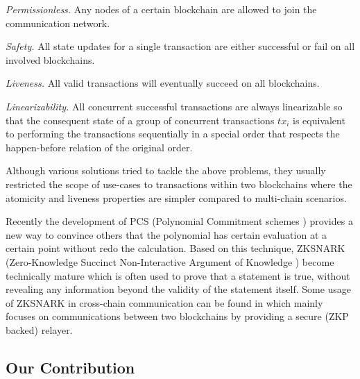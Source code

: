 \smallskip\noindent\emph{Permissionless.} Any nodes of a certain blockchain are allowed to join the communication network.

\smallskip\noindent\emph{Safety.} All state updates for a single transaction are either successful or fail on all involved blockchains.

\smallskip\noindent\emph{Liveness.} All valid transactions will eventually succeed on all blockchains.

\smallskip\noindent\emph{Linearizability.} All concurrent successful transactions are always linearizable so that the consequent state of a group of concurrent transactions $tx_i$ is equivalent to performing the transactions sequentially in a special order that respects the happen-before relation of the original order.

Although various solutions tried to tackle the above problems, they usually restricted the scope of use-cases to transactions within two blockchains where the atomicity and liveness properties are simpler compared to multi-chain scenarios.

Recently the development of PCS (Polynomial Commitment schemes \cite{boneh2020halo-pcs,boneh2020efficient-pcs,kate2010polynomial-pcs}) provides a new way to convince others that the polynomial has certain evaluation at a certain point without redo the calculation. Based on this technique, ZKSNARK (Zero-Knowledge Succinct Non-Interactive Argument of Knowledge \cite{petkus2019and, groth2016size-scheme,chiesa2020marlin-scheme, gong2022analysis-scheme, setty2020spartan-scheme, fiore2016security-scheme}) become technically mature which is often used to prove that a statement is true, without revealing any information beyond the validity of the statement itself. Some usage of ZKSNARK in cross-chain communication can be found in \cite{sidechainzkp, cao2020-zk-atomic, garoffolo2020zendoo} which mainly focuses on communications between two blockchains by providing a secure (ZKP backed) relayer.

\subsection{Our Contribution}

